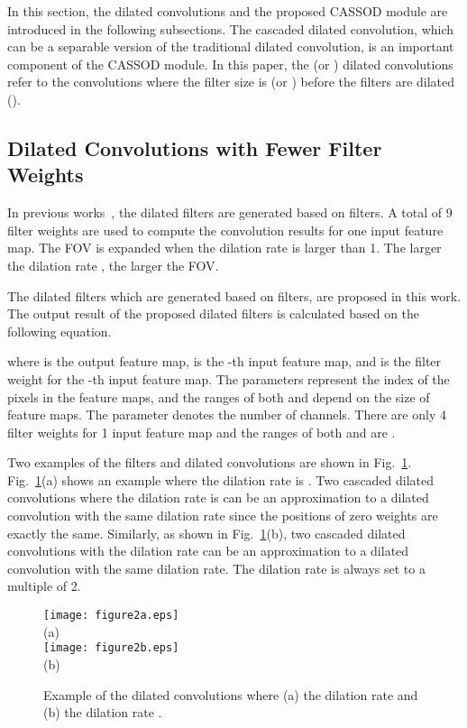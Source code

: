 \documentclass[10pt,twocolumn,letterpaper]{article}
\begin{document}
In this section, the  dilated convolutions and the proposed CASSOD module are introduced in the following subsections. The cascaded  dilated convolution, which can be a separable version of the traditional  dilated convolution, is an important component of the CASSOD module. In this paper, the  (or ) dilated convolutions refer to the convolutions where the filter size is  (or ) before the filters are dilated ().


\subsection{Dilated Convolutions with Fewer Filter Weights}
\label{subsec:dilated}

In previous works~\cite{Hamaguchi17, Hussain19, Lei19, Li18_0, Lin18, Mehta18, Tian18, Wu19, Zhou18}, the dilated filters are generated based on  filters. A total of 9 filter weights are used to compute the convolution results for one input feature map. The FOV is expanded when the dilation rate  is larger than 1. The larger the dilation rate , the larger the FOV.

The dilated filters which are generated based on  filters, are proposed in this work. The output result of the proposed dilated filters is calculated based on the following equation.

where  is the output feature map,  is the -th input feature map, and  is the filter weight for the -th input feature map. The parameters  represent the index of the pixels in the feature maps, and the ranges of both  and  depend on the size of feature maps. The parameter  denotes the number of channels. There are only 4 filter weights for 1 input feature map and the ranges of both  and  are . 

Two examples of the  filters and dilated convolutions are shown in Fig.~\ref{fig:dilated}. Fig.~\ref{fig:dilated}(a) shows an example where the dilation rate  is . Two cascaded  dilated convolutions where the dilation rate  is  can be an approximation to a  dilated convolution with the same dilation rate since the positions of zero weights are exactly the same. Similarly, as shown in Fig.~\ref{fig:dilated}(b),  two cascaded  dilated convolutions with the dilation rate  can be an approximation to a  dilated convolution with the same dilation rate. The dilation rate  is always set to a multiple of 2.


\begin{figure}[h]
\begin{center}
   \texttt{[image: figure2a.eps]}\\
   (a)\\
   \texttt{[image: figure2b.eps]}\\
   (b)\\
\end{center}
   \caption{Example of the  dilated convolutions where (a) the dilation rate  and (b) the dilation rate . }
\label{fig:dilated}
\end{figure}
\end{document}
